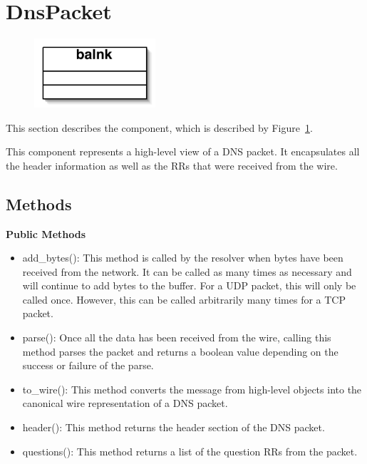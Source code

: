 \section{DnsPacket}\label{sec:dnspkt}

\begin{figure}
\begin{center}
\includegraphics[width=0.4\textwidth]{figs/blank}
\end{center}
\caption{}
\label{fig:dnspkt}
\end{figure}

This section describes the component, which is described by Figure~\ref{fig:dnspkt}.  

This component represents a high-level view of a DNS packet. It encapsulates all the header information as well as the RRs that were received from the wire.


\subsection{Methods}

{\bf Public Methods}
\begin{itemize}
\item add\_bytes(): This method is called by the resolver when bytes have been received from the network. It can be called as many times as necessary and will continue to add bytes to the buffer. For a UDP packet, this will only be called once. However, this can be called arbitrarily many times for a TCP packet.
\item parse(): Once all the data has been received from the wire, calling this method parses the packet and returns a boolean value depending on the success or failure of the parse.
\item to\_wire(): This method converts the message from high-level objects into the canonical wire representation of a DNS packet.
\item header(): This method returns the header section of the DNS packet.
\item questions(): This method returns a list of the question RRs from the packet.
\end{itemize}

